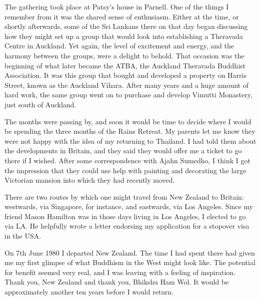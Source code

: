 The gathering took place at Patsy's house in Parnell. One of the things
I remember from it was the shared sense of enthusiasm. Either at the
time, or shortly afterwards, some of the Sri Lankans there on that day
began discussing how they might set up a group that would look into
establishing a Theravada Centre in Auckland. Yet again, the level of
excitement and energy, and the harmony between the groups, were a
delight to behold. That occasion was the beginning of what later became
the ATBA, the Auckland Theravada Buddhist Association. It was this group
that bought and developed a property on Harris Street, known as the
Auckland Vihara\cite{auckland}. After many years and a huge amount of hard work, the
same group went on to purchase and develop Vimutti Monastery\cite{vimutti},
just south of Auckland.

The months were passing by, and soon it would be time to decide where I
would be spending the three months of the Rains Retreat. My parents let
me know they were not happy with the idea of my returning to Thailand. I
had told them about the developments in Britain, and they said they
would offer me a ticket to go there if I wished. After some
correspondence with Ajahn Sumedho, I think I got the impression that
they could use help with painting and decorating the large Victorian
mansion into which they had recently moved.

There are two routes by which one might travel from New Zealand to
Britain: westwards, via Singapore, for instance, and eastwards, via Los
Angeles. Since my friend Mason Hamilton was in those days living in Los
Angeles, I elected to go via LA. He helpfully wrote a letter endorsing
my application for a stopover visa in the USA.

On 7th June 1980 I departed New Zealand. The time I had spent there had
given me my first glimpse of what Buddhism in the West might look like.
The potential for benefit seemed very real, and I was leaving with a
feeling of inspiration. Thank you, New Zealand and thank you, Bhikshu
Ham Wol. It would be approximately another ten years before I would
return.
